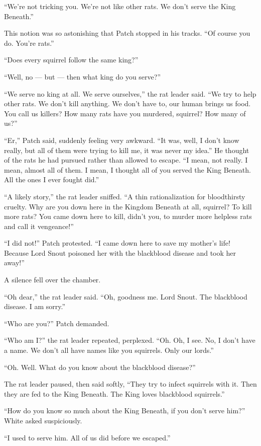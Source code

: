 \documentclass[ebook,oneside,openany,17pt]{memoir}
\begin{document}
“We’re not tricking you. We’re not like other rats. We don’t serve the
King Beneath.”

This notion was so astonishing that Patch stop\-ped in his tracks. “Of
course you do. You’re rats.”

“Does every squirrel follow the same king?”

“Well, no — but — then what king do you serve?”

“We serve no king at all. We serve ourselves,” the rat leader
said. “We try to help other rats. We don’t kill anything. We don’t
have to, our human brings us food. You call us killers? How many rats
have you murdered, squirrel? How many of us?”

“Er,” Patch said, suddenly feeling very awkward. “It was, well, I
don’t know really, but all of them were trying to kill me, it was
never my idea.” He thought of the rats he had pursued rather than
allowed to escape. “I mean, not really. I mean, almost all of them. I
mean, I thought all of you served the King Beneath. All the ones I
ever fought did.”

“A likely story,” the rat leader sniffed. “A thin rationalization for
bloodthirsty cruelty. Why are you down here in the Kingdom Beneath at
all, squirrel? To kill more rats? You came down here to kill, didn’t
you, to murder more helpless rats and call it vengeance!”

“I did not!” Patch protested. “I came down here to save my mother’s
life! Because Lord Snout poisoned her with the blackblood disease and
took her away!”

A silence fell over the chamber.

“Oh dear,” the rat leader said. “Oh, goodness me. Lord Snout. The
blackblood disease. I am sorry.”

“Who are you?” Patch demanded.

“Who am I?” the rat leader repeated, perplexed. “Oh. Oh, I see. No, I
don’t have a name. We don’t all have names like you squirrels. Only
our lords.”

“Oh. Well. What do you know about the blackblood disease?”

The rat leader paused, then said softly, “They try to infect squirrels
with it. Then they are fed to the King Beneath. The King loves
blackblood squirrels.”

“How do you know so much about the King Beneath, if you don’t serve
him?” White asked suspiciously.

“I used to serve him. All of us did before we escaped.”
\end{document}
